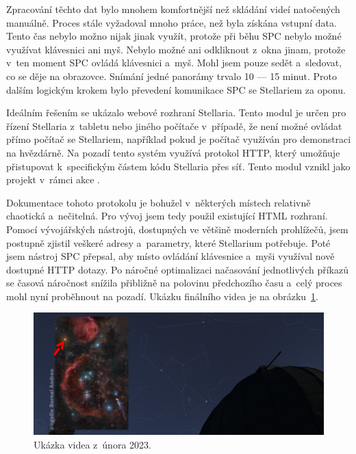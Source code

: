 \documentclass[12pt,a4paper,titlepage]{article}
\begin{document}
Zpracování těchto dat bylo mnohem komfortnější než skládání videí natočených manuálně. Proces stále vyžadoval mnoho práce, než byla získána vstupní data. Tento čas nebylo možno nijak jinak využít, protože při běhu SPC nebylo možné využívat klávesnici ani myš. Nebylo možné ani odkliknout z~okna jinam, protože v~ten moment SPC ovládá klávesnici a~myš. Mohl jsem pouze sedět a~sledovat, co se děje na obrazovce. Snímání jedné panorámy trvalo 10 --- 15 minut. Proto dalším logickým krokem bylo převedení komunikace SPC se Stellariem za oponu. 

Ideálním řešením se ukázalo webové rozhraní Stellaria. Tento modul je určen pro řízení Stellaria z~tabletu nebo jiného počítače v~případě, že není možné ovládat přímo počítač se Stellariem, například pokud je počítač využíván pro demonstraci na hvězdárně. Na pozadí tento systém využívá protokol HTTP, který umožňuje přistupovat k~specifickým částem kódu Stellaria přes síť. Tento modul vznikl jako projekt v~rámci akce . 

Dokumentace tohoto protokolu je bohužel v~některých místech relativně chaotická a~nečitelná. Pro vývoj jsem tedy použil existující HTML rozhraní. Pomocí vývojářských nástrojů, dostupných ve většině moderních prohlížečů, jsem postupně zjistil veškeré adresy a~parametry, které Stellarium potřebuje. Poté jsem nástroj SPC přepsal, aby místo ovládání klávesnice a~myši využíval nově dostupné HTTP dotazy. Po náročné optimalizaci načasování jednotlivých příkazů se časová náročnost snížila přibližně na polovinu předchozího času a~celý proces mohl nyní proběhnout na pozadí. Ukázku finálního videa je na obrázku~\ref{img:unor}.

\begin{figure}[H]
	\centering
	\includegraphics[width=.85\textwidth]{unor.png}
	\caption{Ukázka videa z~února 2023.}\label{img:unor}
\end{figure}
\end{document}
